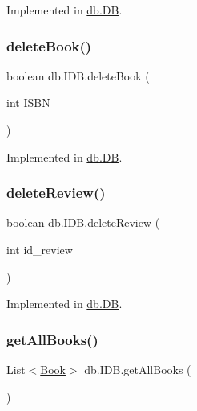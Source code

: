 Implemented in \hyperlink{classdb_1_1_d_b_a8a1a15bae4352c3c73092d801ef26c41}{db.\+DB}.

\mbox{\label{interfacedb_1_1_i_d_b_a8fa065455c75f33b9713b8d5058a0e30}} 
\subsubsection{\texorpdfstring{delete\+Book()}{deleteBook()}}
{\footnotesize\ttfamily boolean db.\+I\+D\+B.\+delete\+Book (\begin{DoxyParamCaption}\item[{int}]{I\+S\+BN }\end{DoxyParamCaption})}



Implemented in \hyperlink{classdb_1_1_d_b_a712d418878efa15112c62eb6db4b022d}{db.\+DB}.

\mbox{\label{interfacedb_1_1_i_d_b_a37810242fa48895f21f790ef6a367225}} 
\subsubsection{\texorpdfstring{delete\+Review()}{deleteReview()}}
{\footnotesize\ttfamily boolean db.\+I\+D\+B.\+delete\+Review (\begin{DoxyParamCaption}\item[{int}]{id\+\_\+review }\end{DoxyParamCaption})}



Implemented in \hyperlink{classdb_1_1_d_b_ab3664756678e77a9f1b9c6c93c81d691}{db.\+DB}.

\mbox{\label{interfacedb_1_1_i_d_b_abd0d41674bbcdd524a3ca2403504bf25}} 
\subsubsection{\texorpdfstring{get\+All\+Books()}{getAllBooks()}}
{\footnotesize\ttfamily List$<$\hyperlink{classserver_1_1data_1_1_book}{Book}$>$ db.\+I\+D\+B.\+get\+All\+Books (\begin{DoxyParamCaption}{ }\end{DoxyParamCaption})}



